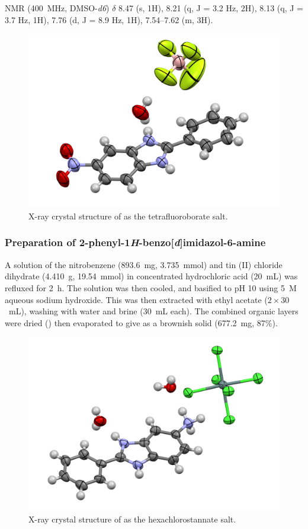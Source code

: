 \begin{refsection}
 NMR (400~MHz, DMSO-\emph{d6}) $\delta$ 8.47 (s, 1H), 8.21 (q, J = 3.2 Hz, 2H), 8.13 (q, J = 3.7 Hz, 1H), 7.76 (d, J = 8.9 Hz, 1H), 7.54--7.62 (m, 3H).

\begin{figure}[ht]
    \centering
    \includegraphics[width=0.8\linewidth]{Figures/rhs-nitro-xray.pdf}
    \caption{X-ray crystal structure of  as the tetrafluoroborate salt.}
    \label{fig:rhs-nitro-xray}
\end{figure}

\subsubsection{Preparation of 2-phenyl-1\emph{H}-benzo[\emph{d}]imidazol-6-amine }
A solution of the nitrobenzene  (893.6~mg, 3.735~mmol) and tin (II) chloride dihydrate (4.410~g, 19.54~mmol) in concentrated hydrochloric acid (20~mL) was refluxed for 2~h.
The solution was then cooled, and basified to pH 10 using 5~M aqueous sodium hydroxide.
This was then extracted with ethyl acetate ($2\times30$~mL), washing with water and brine (30~mL each).
The combined organic layers were dried () then evaporated to give  as a brownish solid (677.2~mg, 87\%).

\begin{figure}[ht]
    \centering
    \includegraphics[width=0.8\linewidth]{Figures/rhs-amine-xray.pdf}
    \caption{X-ray crystal structure of  as the hexachlorostannate salt.}
    \label{fig:rhs-amine-xray}
\end{figure}


\end{refsection}
